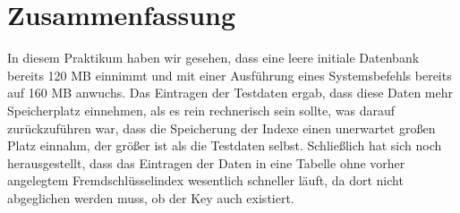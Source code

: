 \chapter{Zusammenfassung}
In diesem Praktikum haben wir gesehen, dass eine leere initiale Datenbank bereits 120 MB einnimmt und mit einer Ausführung eines Systemsbefehls bereits auf 160 MB anwuchs. Das Eintragen der Testdaten ergab, dass diese Daten mehr Speicherplatz einnehmen, als es rein rechnerisch sein sollte, was darauf zurückzuführen war, dass die Speicherung der Indexe einen unerwartet großen Platz einnahm, der größer ist als die Testdaten selbst. Schließlich hat sich noch herausgestellt, dass das Eintragen der Daten in eine Tabelle ohne vorher angelegtem Fremdschlüsselindex wesentlich schneller läuft, da dort nicht abgeglichen werden muss, ob der Key auch existiert.